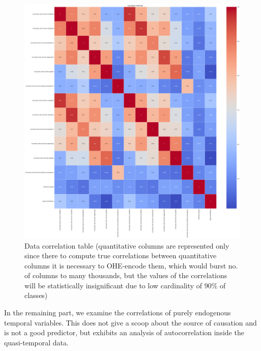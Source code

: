 \documentclass[
  letterpaper,
  DIV=11,
  numbers=noendperiod]{scrartcl}
\begin{document}
\begin{figure}

{\centering \includegraphics{report_AzadhdhinNedalYunisAlFraijat_files/figure-pdf/fig-correlation-output-1.png}

}

\caption{\label{fig-correlation}Data correlation table (quantitative
columns are represented only since there to compute true correlations
between quantitative columns it is necessary to OHE-encode them, which
would burst no. of columns to many thousands, but the values of the
correlations will be statistically insignificant due to low cardinality
of 90\% of classes)}

\end{figure}

In the remaining part, we examine the correlations of purely endogenous
temporal variables. This does not give a scoop about the source of
causation and is not a good predictor, but exhibits an analysis of
autocorrelation inside the quasi-temporal data.
\end{document}
